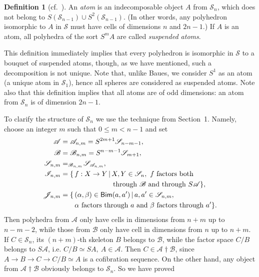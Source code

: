 \documentclass[12pt,a4paper]{amsart}
\theoremstyle{definition}
\newtheorem{defin}[theorem]{Definition}
\theoremstyle{remark}
\numberwithin{equation}{section}
\begin{document}
  \begin{defin}[cf.~\cite{ba}]\label{21}
  An \emph{atom} is an indecomposable object $A$ from ${\mathscr S}_n$, which does not belong to
 $S({\mathscr S}_{n-1})\cup S^2({\mathscr S}_{n-1})$. (In other words, any polyhedron isomorphic
 to $A$ in ${\mathscr S}$ must have cells of dimensions $n$ and $2n-1$.) If $A$ is an atom, all
 polyhedra of the sort $S^mA$ are called \emph{suspended atoms}.
 \end{defin}

 This definition immediately implies that every polyhedron is isomorphic in ${\mathscr S}$ to a bouquet of
 suspended atoms, though, as we have mentioned, such a decomposition is not unique. 
 Note that, unlike Baues, we consider $S^1$ as an atom (a unique atom in ${\mathscr S}_1$), hence all
 spheres are  considered as suspended atoms. Note also that this definition implies that all atoms 
 are of odd dimensions: an atom from ${\mathscr S}_n$ is of dimension $2n-1$.

 To clarify the structure of ${\mathscr S}_n$ we use the technique from Section~1. Namely, choose an
 integer $m$ such that $0\le m<n-1$ and set
  \begin{equation}\label{e22}
  \begin{split}
   {\mathscr A}&={\mathscr A}_{n,m}=S^{2m+1}{\mathscr S}_{n-m-1},\\ {\mathscr B}&={\mathscr B}_{n,m}=S^{n-m-1}{\mathscr S}_{m+1},\\ 
  {\mathscr S}_{n,m}&=_{{\mathscr B}_{n,m}}\!{\mathscr S}\!_{{\mathscr A}_{n,m}},\\
  {\mathscr I}_{n,m}&=\{\,f:X\to Y\,|\,X,Y\in{\mathscr S}_n,\ f \text{ factors both}\\
   &\hskip7.5em \text{through ${\mathscr B}$ and  through } S{\mathscr A}\},\\
  {\mathscr J}_{n,m}&=\{\,({\alpha},{\beta})\in{\mathop\mathsf{Bim}\nolimits}(a,a')\,|\,a,a'\in{\mathscr S}_{n,m},\\ &\qquad{\alpha} \text{ factors through } a
	 \text{ and } {\beta} \text{ factors through } a'\}.
  \end{split}
  \end{equation}
 Then polyhedra from ${\mathscr A}$ only have cells in dimensions from $n+m$ up to $n-m-2$,
 while those from ${\mathscr B}$ only have cell in dimensions from $n$ up to $n+m$. If $C\in{\mathscr S}_n$,
 its $(n+m)$-th skeleton $B$ belongs to ${\mathscr B}$, while the factor space $C/B$ belongs to $S{\mathscr A}$,
 i.e. $C/B\simeq SA,\ A\in{\mathscr A}$. Then $C\in{\mathscr A}{\dagger}{\mathscr B}$, since $A\to B\to C\to C/B\simeq A$
 is a cofibration sequence. On the other hand, any object from ${\mathscr A}{\dagger}{\mathscr B}$ obviously belongs to
 ${\mathscr S}_n$. So we have proved
\end{document}
